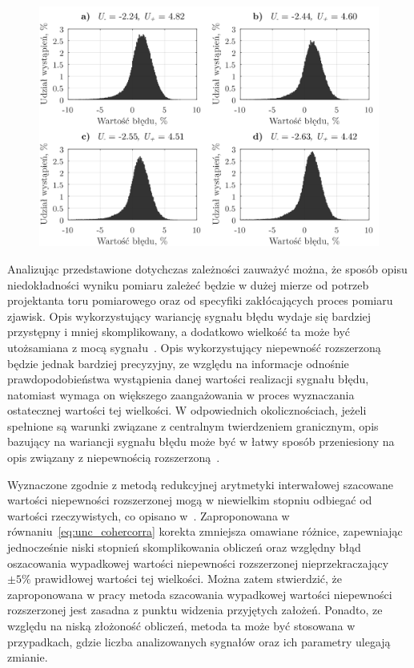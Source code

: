 \begin{figure}[htb!]
\begin{center}
\includegraphics{obrazki/hist_reductive}
\end{center}
\end{figure}

Analizując przedstawione dotychczas zależności zauważyć można, że sposób opisu niedokładności wyniku pomiaru zależeć będzie w dużej mierze od potrzeb projektanta toru pomiarowego oraz od specyfiki zakłócających proces pomiaru zjawisk. Opis wykorzystujący wariancję sygnału błędu wydaje się bardziej przystępny i mniej skomplikowany, a dodatkowo wielkość ta może być utożsamiana z mocą sygnału~\cite{proakis_dsp}. Opis wykorzystujący niepewność rozszerzoną będzie jednak bardziej precyzyjny, ze względu na informacje odnośnie prawdopodobieństwa wystąpienia danej wartości realizacji sygnału błędu, natomiast wymaga on większego zaangażowania w proces wyznaczania ostatecznej wartości tej wielkości. W odpowiednich okolicznościach, jeżeli spełnione są warunki związane z centralnym twierdzeniem granicznym, opis bazujący na wariancji sygnału błędu może być w łatwy sposób przeniesiony na opis związany z niepewnością rozszerzoną~\cite{jcgm_guide}.

Wyznaczone zgodnie z metodą redukcyjnej arytmetyki interwałowej szacowane wartości niepewności rozszerzonej mogą w niewielkim stopniu odbiegać od wartości rzeczywistych, co opisano w~\cite{jakubiec_redmono, jakubiec_model}. Zaproponowana w równaniu~\eqref{eq:unc_cohercorra} korekta zmniejsza omawiane różnice, zapewniając jednocześnie niski stopnień skomplikowania obliczeń oraz względny błąd oszacowania wypadkowej wartości niepewności rozszerzonej nieprzekraczający $\pm 5\%$ prawidłowej wartości tej wielkości. Można zatem stwierdzić, że zaproponowana w pracy metoda szacowania wypadkowej wartości niepewności rozszerzonej jest zasadna z punktu widzenia przyjętych założeń. Ponadto, ze względu na niską złożoność obliczeń, metoda ta może być stosowana w przypadkach, gdzie liczba analizowanych sygnałów oraz ich parametry ulegają zmianie.


